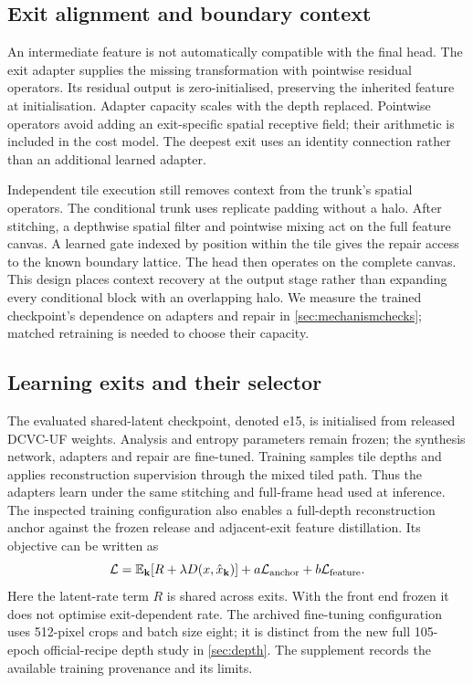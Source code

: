 \subsection{Exit alignment and boundary context}

An intermediate feature is not automatically compatible with the final head.
The exit adapter supplies the missing transformation with pointwise residual
operators. Its residual output is zero-initialised, preserving the inherited
feature at initialisation. Adapter capacity scales with the depth replaced. Pointwise operators
avoid adding an exit-specific spatial receptive field; their arithmetic
is included in the cost model. The deepest exit uses an identity
connection rather than an additional learned adapter.

Independent tile execution still removes context from the trunk's spatial
operators. The conditional trunk uses replicate padding without a halo.
After stitching, a depthwise spatial filter and pointwise mixing act on the
full feature canvas. A learned gate indexed by position within the tile
gives the repair access to the known boundary lattice. The head then operates
on the complete canvas. This design places context recovery at the output stage rather than
expanding every conditional block with an overlapping halo. We measure
the trained checkpoint's dependence on adapters and repair in
\cref{sec:mechanismchecks}; matched retraining is needed to choose their
capacity.

\subsection{Learning exits and their selector}

The evaluated shared-latent checkpoint, denoted e15, is initialised from
released DCVC-UF weights.
Analysis and entropy parameters remain frozen; the synthesis network,
adapters and repair are fine-tuned. Training samples tile depths and applies
reconstruction supervision through the mixed tiled path. Thus the adapters
learn under the same stitching and full-frame head used at inference. The inspected training configuration also enables a full-depth
reconstruction anchor against the frozen release and adjacent-exit feature
distillation. Its objective can be written as
\begin{equation}
 \mathcal L=\mathbb E_{\mathbf k}\!\left[R+\lambda D(x,\hat x_{\mathbf k})\right]
 +a\mathcal L_{\rm anchor}+b\mathcal L_{\rm feature}.
 \label{eq:training}
\end{equation}
Here the latent-rate term $R$ is shared across exits. With the front end
frozen it does not optimise exit-dependent rate. The archived fine-tuning
configuration uses 512-pixel crops and batch size eight; it is distinct from
the new full 105-epoch official-recipe depth study in \cref{sec:depth}.
The supplement records the available training provenance and its limits.

